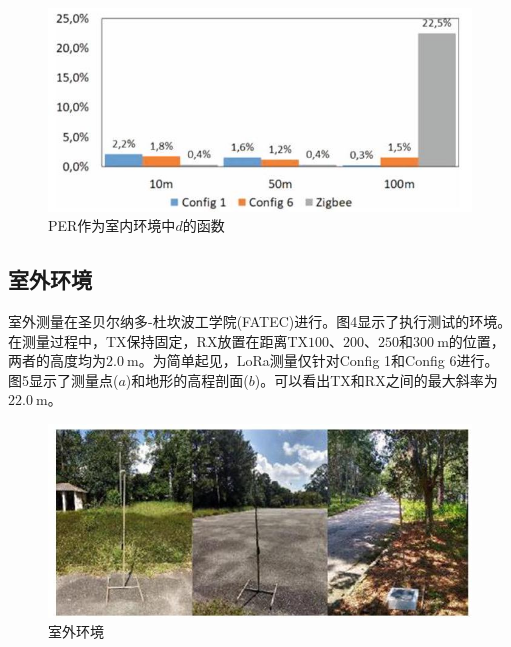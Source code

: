 \documentclass[10pt]{ctexart}
\begin{document}
\begin{figure}[H]
  \centering
  \includegraphics[max width=\textwidth]{2022_02_28_100dc43db44c8290ce2ag-04(1)}
  \renewcommand{\figurename}{图}
  \caption{PER作为室内环境中$d$的函数}
\end{figure}

\subsection{室外环境}

室外测量在圣贝尔纳多-杜坎波工学院(FATEC)进行。图4显示了执行测试的环境。在测量过程中，TX保持固定，RX放置在距离TX$100$、$200$、$250$和$300\mathrm{~m}$的位置，两者的高度均为$2.0\mathrm{~m}$。为简单起见，LoRa测量仅针对Config 1和Config 6进行。图5显示了测量点($a$)和地形的高程剖面($b$)。可以看出TX和RX之间的最大斜率为$22.0\mathrm{~m}$。

\begin{figure}[H]
  \centering
  \includegraphics[max width=\textwidth]{2022_02_28_100dc43db44c8290ce2ag-05}
  \renewcommand{\figurename}{图}
  \caption{室外环境}
\end{figure}
\end{document}
